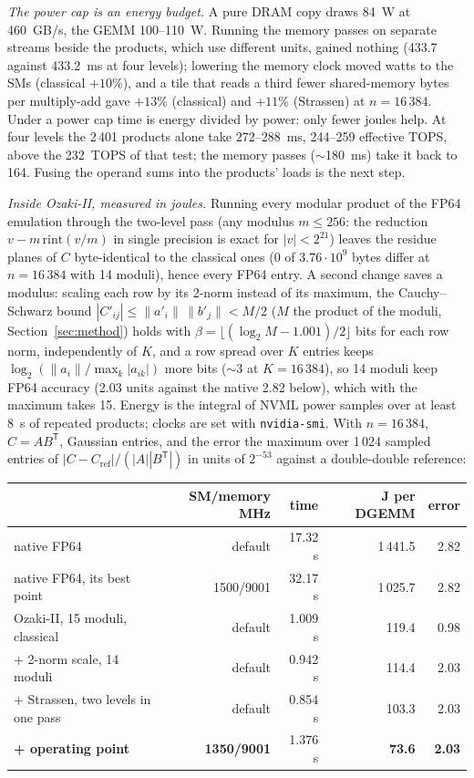 \documentclass[11pt]{article}
\begin{document}
\emph{The power cap is an energy budget.} A pure DRAM copy draws 84~W at 460~GB/s, the GEMM 100--110~W. Running the memory
passes on separate streams beside the products, which use different units, gained nothing (433.7 against 433.2~ms at four
levels); lowering the memory clock moved watts to the SMs (classical $+10\%$), and a tile that reads a third fewer
shared-memory bytes per multiply-add gave $+13\%$ (classical) and $+11\%$ (Strassen) at $n=16\,384$. Under a power cap time is energy divided by power: only fewer joules
help. At four levels the 2\,401 products alone take 272--288~ms, 244--259 effective TOPS, above the 232~TOPS of that test; the memory passes
($\sim$180~ms) take it back to 164. Fusing the operand sums into the products' loads is the next step.

\emph{Inside Ozaki-II, measured in joules.} Running every modular product of the FP64 emulation through the two-level pass
(any modulus $m\le256$: the reduction $v-m\,\mathrm{rint}(v/m)$ in single precision is exact for $|v|<2^{21}$) leaves the
residue planes of $C$ byte-identical to the classical ones (0 of $3.76\cdot10^9$ bytes differ at $n=16\,384$ with 14 moduli),
hence every FP64 entry. A second change saves a modulus: scaling each row by its 2-norm instead of its maximum, the
Cauchy--Schwarz bound $|C'_{ij}|\le\|a'_i\|\,\|b'_j\|<M/2$ ($M$ the product of the moduli, Section~\ref{sec:method}) holds with
$\beta=\lfloor(\log_2M-1.001)/2\rfloor$ bits for each row norm, independently of $K$, and a row spread over $K$ entries keeps
$\log_2(\|a_i\|/\max_k|a_{ik}|)$ more bits ($\sim$3 at $K=16\,384$), so 14 moduli keep FP64 accuracy (2.03 units against the
native 2.82 below), which with the maximum takes 15. Energy is the integral of NVML power samples over at
least 8~s of repeated products; clocks are set with \texttt{nvidia-smi}. With $n=16\,384$, $C=AB^{\mathsf T}$, Gaussian
entries, and the error the maximum over 1\,024 sampled entries of $|C-C_{\mathrm{ref}}|/(|A||B^{\mathsf T}|)$ in units of
$2^{-53}$ against a double-double reference:
\begin{center}\begin{tabular}{lrrrr}\toprule
& SM/memory MHz & time & J per DGEMM & error \\\midrule
native FP64 & default & 17.32 s & 1\,441.5 & 2.82 \\
native FP64, its best point & 1500/9001 & 32.17 s & 1\,025.7 & 2.82 \\
Ozaki-II, 15 moduli, classical & default & 1.009 s & 119.4 & 0.98 \\
+ 2-norm scale, 14 moduli & default & 0.942 s & 114.4 & 2.03 \\
+ Strassen, two levels in one pass & default & 0.854 s & 103.3 & 2.03 \\
\textbf{+ operating point} & \textbf{1350/9001} & 1.376 s & \textbf{73.6} & \textbf{2.03} \\\bottomrule
\end{tabular}\end{center}
\end{document}
